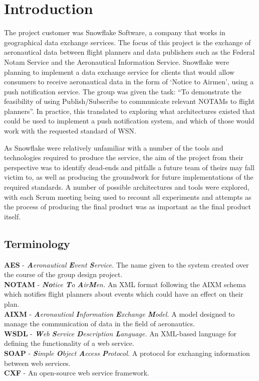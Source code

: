 \documentclass[a4paper, 12pt, twoside]{article}
\begin{document}
\newpage

\tableofcontents
\newpage

\listoffigures
\newpage

\section{Introduction}
\label{sec:introduction}

The project customer was Snowflake Software, a company that works in geographical data exchange services. The focus of this project is the exchange of aeronautical data between flight planners and data publishers such as the Federal Notam Service and the Aeronautical Information Service. Snowflake were planning to implement a data exchange service for clients that would allow consumers to receive aeronautical data in the form of `Notice to Airmen', using a push notification service. The group was given the task: ``To demonstrate the feasibility of using Publish/Subscribe to communicate relevant NOTAMs to flight planners''. In practice, this translated to exploring what architectures existed that could be used to implement a push notification system, and which of those would work with the requested standard of WSN.

As Snowflake were relatively unfamiliar with a number of the tools and technologies required to produce the service, the aim of the project from their perspective was to identify dead-ends and pitfalls a future team of theirs may fall victim to, as well as producing the groundwork for future implementations of the required standards. A number of possible architectures and tools were explored, with each Scrum meeting being used to recount all experiments and attempts as the process of producing the final product was as important as the final product itself.

\subsection{Terminology}
\label{sec:terminology}
\textbf{AES} - \textit{\textbf{A}eronautical \textbf{E}vent \textbf{S}ervice.} The name given to the system created over the course of the group design project.
\\
\textbf{NOTAM} - \textit{\textbf{No}tice \textbf{T}o \textbf{A}ir\textbf{M}en.} An XML format following the AIXM schema which notifies flight planners about events which could have an effect on their plan.
\\
\textbf{AIXM} - \textit{\textbf{A}eronautical \textbf{I}nformation \textbf{E}xchange \textbf{M}odel.} A model designed to manage the communication of data in the field of aeronautics.
\\
\textbf{WSDL} - \textit{\textbf{W}eb \textbf{S}ervice \textbf{D}escription \textbf{L}anguage.} An XML-based language for defining the functionality of a web service.
\\
\textbf{SOAP} - \textit{\textbf{S}imple \textbf{O}bject \textbf{A}ccess \textbf{P}rotocol.} A protocol for exchanging information between web services.
\\
\textbf{CXF} - An open-source web service framework.
\end{document}
